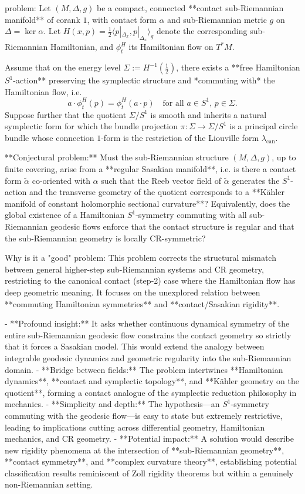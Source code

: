 problem:  
Let \((M,\Delta,g)\) be a compact, connected **contact sub-Riemannian manifold** of corank \(1\), with contact form \(\alpha\) and sub-Riemannian metric \(g\) on \(\Delta=\ker\alpha\). Let \(H(x,p)=\tfrac{1}{2}\langle p|_{\Delta_x},p|_{\Delta_x}\rangle_g\) denote the corresponding sub-Riemannian Hamiltonian, and \(\phi_t^H\) its Hamiltonian flow on \(T^*M\).  

Assume that on the energy level \(\Sigma:=H^{-1}(\tfrac{1}{2})\),
there exists a **free Hamiltonian \(S^1\)-action** preserving the symplectic structure and *commuting with* the Hamiltonian flow, i.e. 
\[
a\cdot \phi_t^H(p)=\phi_t^H(a\cdot p)\quad \text{for all } a\in S^1,\,p\in \Sigma.
\]
Suppose further that the quotient \(\Sigma/S^1\) is smooth and inherits a natural symplectic form for which the bundle projection \(\pi:\Sigma\to \Sigma/S^1\) is a principal circle bundle whose connection \(1\)-form is the restriction of the Liouville form \(\lambda_{\mathrm{can}}\).  

**Conjectural problem:**  
Must the sub-Riemannian structure \((M,\Delta,g)\), up to finite covering, arise from a **regular Sasakian manifold**, i.e. is there a contact form \(\tilde\alpha\) co-oriented with \(\alpha\) such that the Reeb vector field of \(\tilde\alpha\) generates the \(S^1\)-action and the transverse geometry of the quotient corresponds to a **Kähler manifold of constant holomorphic sectional curvature**?  
Equivalently, does the global existence of a Hamiltonian \(S^1\)-symmetry commuting with all sub-Riemannian geodesic flows enforce that the contact structure is regular and that the sub-Riemannian geometry is locally CR-symmetric?

Why is it a "good" problem:  
This problem corrects the structural mismatch between general higher-step sub-Riemannian systems and CR geometry, restricting to the canonical contact (step‑2) case where the Hamiltonian flow has deep geometric meaning. It focuses on the unexplored relation between **commuting Hamiltonian symmetries** and **contact/Sasakian rigidity**.  

- **Profound insight:** It asks whether continuous dynamical symmetry of the entire sub-Riemannian geodesic flow constrains the contact geometry so strictly that it forces a Sasakian model. This would extend the analogy between integrable geodesic dynamics and geometric regularity into the sub-Riemannian domain.  
- **Bridge between fields:** The problem intertwines **Hamiltonian dynamics**, **contact and symplectic topology**, and **Kähler geometry on the quotient**, forming a contact analogue of the symplectic reduction philosophy in mechanics.  
- **Simplicity and depth:** The hypothesis—an \(S^1\)-symmetry commuting with the geodesic flow—is easy to state but extremely restrictive, leading to implications cutting across differential geometry, Hamiltonian mechanics, and CR geometry.  
- **Potential impact:** A solution would describe new rigidity phenomena at the intersection of **sub-Riemannian geometry**, **contact symmetry**, and **complex curvature theory**, establishing potential classification results reminiscent of Zoll rigidity theorems but within a genuinely non-Riemannian setting.